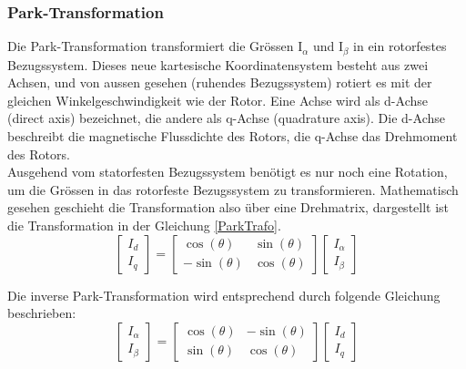 \subsubsection*{Park-Transformation}
Die Park-Transformation transformiert die Grössen I$_{\alpha}$ und I$_{\beta}$ in ein rotorfestes Bezugssystem. Dieses neue kartesische Koordinatensystem besteht aus zwei Achsen, und von aussen gesehen (ruhendes Bezugssystem) rotiert es mit der gleichen Winkelgeschwindigkeit wie der Rotor. Eine Achse wird als d-Achse (direct axis) bezeichnet, die andere als q-Achse (quadrature axis). Die d-Achse beschreibt die magnetische Flussdichte des Rotors, die q-Achse das Drehmoment des Rotors. \\
Ausgehend vom statorfesten Bezugssystem benötigt es nur noch eine Rotation, um die Grössen in das rotorfeste Bezugssystem zu transformieren. Mathematisch gesehen geschieht die Transformation also über eine Drehmatrix, dargestellt ist die Transformation in der Gleichung \ref{ParkTrafo}. 
\begin{equation}\label{ParkTrafo}
\left[
\begin{array}{c}
I_d \\ 
I_q
\end{array} 
\right]
= 
\left[
\begin{array}{cc}
\cos (\theta) & \sin(\theta) \\
-\sin(\theta)  & \cos(\theta)
\end{array} 
\right] 
\left[
\begin{array}{c}
I_\alpha \\ 
I_\beta
\end{array} 
\right]
\end{equation}

Die inverse Park-Transformation wird entsprechend durch folgende Gleichung beschrieben:
\begin{equation}\label{invParkTrafo}
\left[
\begin{array}{c}	
I_\alpha \\ 
I_\beta
\end{array} 
\right]
= 
\left[
\begin{array}{cc}
\cos (\theta) & -\sin(\theta) \\
\sin(\theta)  & \cos(\theta)
\end{array} 
\right] 
\left[
\begin{array}{c}
I_d \\ 
I_q
\end{array} 
\right]
\end{equation}

